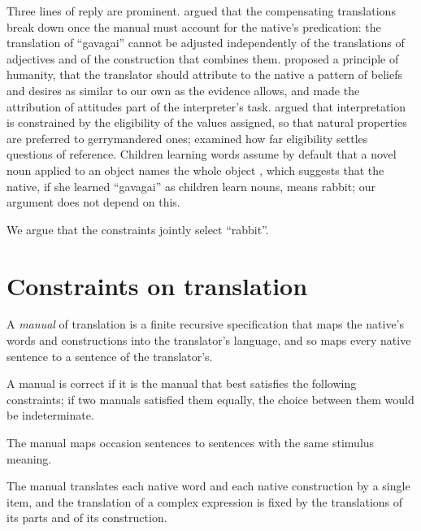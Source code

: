 \documentclass{situationist-preprint}
\begin{document}
Three lines of reply are prominent. \citet{Evans1975} argued that the compensating translations break down once the manual must account for the native's predication: the translation of \enquote{gavagai} cannot be adjusted independently of the translations of adjectives and of the construction that combines them. \citet{Grandy1973} proposed a principle of humanity, that the translator should attribute to the native a pattern of beliefs and desires as similar to our own as the evidence allows, and \citet{Lewis1974} made the attribution of attitudes part of the interpreter's task. \citet{Lewis1983,Lewis1984} argued that interpretation is constrained by the eligibility of the values assigned, so that natural properties are preferred to gerrymandered ones; \citet{Williams2007} examined how far eligibility settles questions of reference. Children learning words assume by default that a novel noun applied to an object names the whole object \citep{Markman1990}, which suggests that the native, if she learned \enquote{gavagai} as children learn nouns, means rabbit; our argument does not depend on this.

We argue that the constraints jointly select \enquote{rabbit}.

\section{Constraints on translation}

\begin{definition}[Manual]\label{d:manual}
A \emph{manual} of translation is a finite recursive specification that maps the native's words and constructions into the translator's language, and so maps every native sentence to a sentence of the translator's.
\end{definition}

A manual is correct if it is the manual that best satisfies the following constraints; if two manuals satisfied them equally, the choice between them would be indeterminate.

\begin{principle}\label{p:stim}
The manual maps occasion sentences to sentences with the same stimulus meaning.
\end{principle}

\begin{principle}[Uniformity]\label{p:unif}
The manual translates each native word and each native construction by a single item, and the translation of a complex expression is fixed by the translations of its parts and of its construction.
\end{principle}
\end{document}
